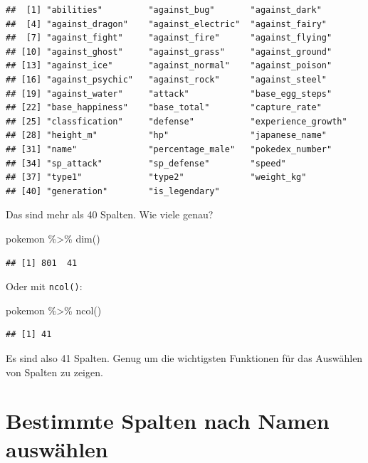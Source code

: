 \documentclass[
]{book}
\newenvironment{Shaded}{\begin{snugshade}}{\end{snugshade}}
\newcommand{\FunctionTok}[1]{\textcolor[rgb]{0.00,0.00,0.00}{#1}}
\newcommand{\NormalTok}[1]{#1}
\newcommand{\SpecialCharTok}[1]{\textcolor[rgb]{0.00,0.00,0.00}{#1}}
\begin{document}
\begin{verbatim}
##  [1] "abilities"         "against_bug"       "against_dark"     
##  [4] "against_dragon"    "against_electric"  "against_fairy"    
##  [7] "against_fight"     "against_fire"      "against_flying"   
## [10] "against_ghost"     "against_grass"     "against_ground"   
## [13] "against_ice"       "against_normal"    "against_poison"   
## [16] "against_psychic"   "against_rock"      "against_steel"    
## [19] "against_water"     "attack"            "base_egg_steps"   
## [22] "base_happiness"    "base_total"        "capture_rate"     
## [25] "classfication"     "defense"           "experience_growth"
## [28] "height_m"          "hp"                "japanese_name"    
## [31] "name"              "percentage_male"   "pokedex_number"   
## [34] "sp_attack"         "sp_defense"        "speed"            
## [37] "type1"             "type2"             "weight_kg"        
## [40] "generation"        "is_legendary"
\end{verbatim}

Das sind mehr als 40 Spalten. Wie viele genau?

\begin{Shaded}
\begin{Highlighting}[]
\NormalTok{pokemon }\SpecialCharTok{\%\textgreater{}\%} \FunctionTok{dim}\NormalTok{()}
\end{Highlighting}
\end{Shaded}

\begin{verbatim}
## [1] 801  41
\end{verbatim}

Oder mit \texttt{ncol()}:

\begin{Shaded}
\begin{Highlighting}[]
\NormalTok{pokemon }\SpecialCharTok{\%\textgreater{}\%} \FunctionTok{ncol}\NormalTok{()}
\end{Highlighting}
\end{Shaded}

\begin{verbatim}
## [1] 41
\end{verbatim}

Es sind also 41 Spalten. Genug um die wichtigsten Funktionen für das Auswählen von Spalten zu zeigen.

\hypertarget{bestimmte-spalten-nach-namen-auswuxe4hlen}{%
\section{Bestimmte Spalten nach Namen auswählen}\label{bestimmte-spalten-nach-namen-auswuxe4hlen}}
\end{document}
